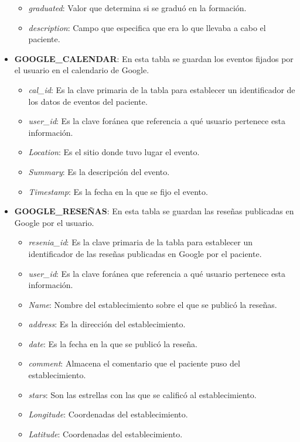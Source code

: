 \begin{itemize}
\begin{itemize}
		\item \textit{ graduated}: Valor que determina si se graduó en la formación.
		\item \textit{ description}: Campo que especifica que era lo que llevaba a cabo el paciente.
	\end{itemize}
	\item \textbf{GOOGLE\_CALENDAR}: En esta tabla se guardan los eventos fijados por el usuario en el calendario de Google.
	\begin{itemize}
		\item \textit{ cal\_id}: Es la clave primaria de la tabla para establecer un identificador de los datos de eventos del paciente.
		\item \textit{ user\_id}: Es la clave foránea que referencia a qué usuario pertenece esta información.
		\item \textit{ Location}: Es el sitio donde tuvo lugar el evento.
		\item \textit{ Summary}: Es la descripción del evento.
		\item \textit{ Timestamp}: Es la fecha en la que se fijo el evento.
	\end{itemize}
	\item \textbf{GOOGLE\_RESEÑAS}: En esta tabla se guardan las reseñas publicadas en Google por el usuario.
	\begin{itemize}
		\item \textit{ resenia\_id}: Es la clave primaria de la tabla para establecer un identificador de las reseñas publicadas en Google por el paciente.
		\item \textit{ user\_id}: Es la clave foránea que referencia a qué usuario pertenece esta información.
		\item \textit{ Name}: Nombre del establecimiento sobre el que se publicó la reseñas.
		\item \textit{ address}: Es la dirección del establecimiento.
		\item \textit{ date}: Es la fecha en la que se publicó la reseña.
		\item \textit{ comment}: Almacena el comentario que el paciente puso del establecimiento.
		\item \textit{ stars}: Son las estrellas con las que se calificó al establecimiento.
		\item \textit{ Longitude}: Coordenadas del establecimiento.
		\item \textit{ Latitude}:  Coordenadas del establecimiento.
	\end{itemize}

\end{itemize}
